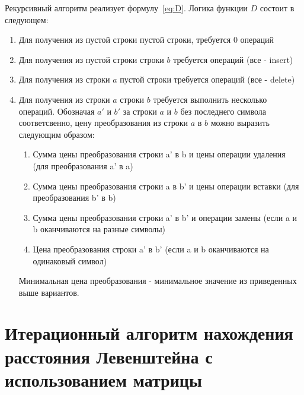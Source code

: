\documentclass[12pt]{report}
\begin{document}
    Рекурсивный алгоритм реализует формулу~\ref{eq:D}. Логика функции $D$ состоит в следующем:
    \begin{enumerate}
        \item Для получения из пустой строки пустой строки, требуется 0 операций
        \item Для получения из пустой строки строки $b$ требуется  операций (все - insert)
        \item Для получения из строки $a$ пустой строки требуется  операций (все - delete)
        \item Для получения из строки $a$ строки $b$ требуется выполнить несколько операций.
        Обозначая $a'$ и $b'$ за строки $a$ и $b$ без последнего символа соответсвенно, цену преобразования 
        из строки $a$ в $b$ можно выразить следующим образом:
        \begin{enumerate}
            \item Сумма цены преобразования строки a' в b и цены операции удаления (для преобразования a' в a)
            \item Сумма цены преобразования строки a в b' и цены операции вставки (для преобразования b' в b)
            \item Сумма цены преобразования строки a' в b' и операции замены
            (если a и b оканчиваются на разные символы)
            \item Цена преобразования строки a' в b' (если a и b оканчиваются на одинаковый символ)
        \end{enumerate}
        Минимальная цена преобразования - минимальное значение из приведенных выше вариантов.
    \end{enumerate}

    \section{Итерационный алгоритм нахождения расстояния Левенштейна с использованием матрицы}
\end{document}
